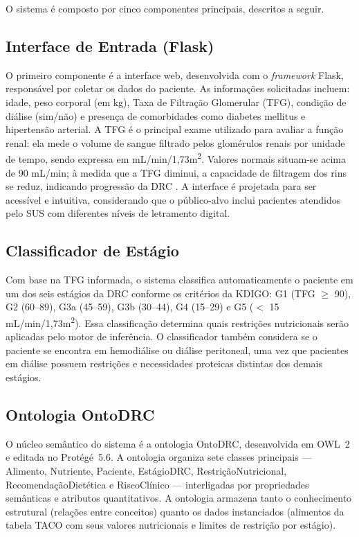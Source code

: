 \documentclass[12pt, a4paper, twocolumn]{article}
\begin{document}
O sistema é composto por cinco componentes principais, descritos a seguir.

    \subsection{Interface de Entrada (Flask)}

O primeiro componente é a interface web, desenvolvida com o \textit{framework} Flask, responsável por coletar os dados do paciente. As informações solicitadas incluem: idade, peso corporal (em kg), Taxa de Filtração Glomerular (TFG), condição de diálise (sim/não) e presença de comorbidades como diabetes mellitus e hipertensão arterial. A TFG é o principal exame utilizado para avaliar a função renal: ela mede o volume de sangue filtrado pelos glomérulos renais por unidade de tempo, sendo expressa em mL/min/1,73m\textsuperscript{2}. Valores normais situam-se acima de 90 mL/min; à medida que a TFG diminui, a capacidade de filtragem dos rins se reduz, indicando progressão da DRC \cite{kdigo2024}. A interface é projetada para ser acessível e intuitiva, considerando que o público-alvo inclui pacientes atendidos pelo SUS com diferentes níveis de letramento digital.

    \subsection{Classificador de Estágio}

Com base na TFG informada, o sistema classifica automaticamente o paciente em um dos seis estágios da DRC conforme os critérios da KDIGO: G1 (TFG $\geq$ 90), G2 (60--89), G3a (45--59), G3b (30--44), G4 (15--29) e G5 ($<$ 15 mL/min/1,73m\textsuperscript{2}). Essa classificação determina quais restrições nutricionais serão aplicadas pelo motor de inferência. O classificador também considera se o paciente se encontra em hemodiálise ou diálise peritoneal, uma vez que pacientes em diálise possuem restrições e necessidades proteicas distintas dos demais estágios.

    \subsection{Ontologia OntoDRC}

O núcleo semântico do sistema é a ontologia OntoDRC, desenvolvida em OWL~2 e editada no Protégé~5.6. A ontologia organiza sete classes principais --- Alimento, Nutriente, Paciente, EstágioDRC, RestriçãoNutricional, RecomendaçãoDietética e RiscoClínico --- interligadas por propriedades semânticas e atributos quantitativos. A ontologia armazena tanto o conhecimento estrutural (relações entre conceitos) quanto os dados instanciados (alimentos da tabela TACO com seus valores nutricionais e limites de restrição por estágio).
\end{document}
